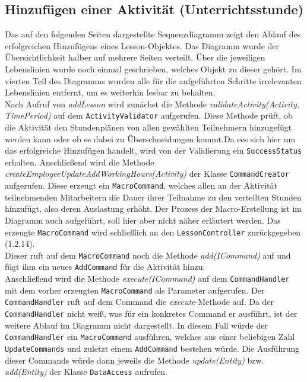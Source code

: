 \documentclass[fontsize=12pt,paper=a4,twoside]{scrartcl}
\begin{document}
\subsection{Hinzufügen einer Aktivität (Unterrichtsstunde)}
Das auf den folgenden Seiten dargestellte Sequenzdiagramm zeigt den Ablauf des erfolgreichen Hinzufügens eines Lesson-Objektes. Das Diagramm wurde der Übersichtlichkeit halber auf mehrere Seiten verteilt. Über die jeweiligen Lebenslinien wurde noch einmal geschrieben, welches Objekt zu dieser gehört. Im vierten Teil des Diagramms wurden alle für die aufgeführten Schritte irrelevanten Lebenslinien entfernt, um es weiterhin lesbar zu behalten.\\
Nach Aufruf von \textit{addLesson} wird zunächst die Methode \textit{validateActivity(Activity, TimePeriod)} auf dem \texttt{ActivityValidator} aufgerufen. Diese Methode prüft, ob die Aktivität den Stundenplänen von allen gewählten Teilnehmern hinzugefügt werden kann oder ob es dabei zu Überschneidungen kommt.Da ees sich hier um das erfolgreiche Hinzufügen handelt, wird von der Validierung ein \texttt{SuccessStatus} erhalten. Anschließend wird die Methode \textit{createEmployeeUpdateAddWorkingHours(Activity)} der Klasse \texttt{CommandCreator} aufgerufen. Diese erzeugt ein \texttt{MacroCommand}, welches allen an der Aktivität teilnehmenden Mitarbeitern die Dauer ihrer Teilnahme zu den verteilten Stunden hinzufügt, also deren Auslastung erhöht. Der Prozess der Macro-Erstellung ist im Diagramm auch aufgeführt, soll hier aber nicht näher erläutert werden. Das erzeugte \texttt{MacroCommand} wird schließlich an den \texttt{LessonController} zurückgegeben (1.2.14).\\
Dieser ruft auf dem \texttt{MacroCommand} noch die Methode \textit{add(ICommand)} auf und fügt ihm ein neues \texttt{AddCommand} für die Aktivität hinzu. \\
Anschließend wird die Methode \textit{execute(ICommand)} auf dem \texttt{CommandHandler} mit dem vorher erzeugten \texttt{MacroCommand} als Parameter aufgerufen. Der \texttt{CommandHandler} ruft auf dem Command die \textit{execute}-Methode auf. Da der \texttt{CommandHandler} nicht weiß, was für ein konkretes Command er ausführt, ist der weitere Ablauf im Diagramm nicht dargestellt. In diesem Fall würde der \texttt{CommandHandler} ein \texttt{MacroCommand} ausführen, welches aus einer beliebigen Zahl \texttt{UpdateCommands} und zuletzt einem \texttt{AddCommand} bestehen würde. Die Ausführung dieser Commands würde dann jeweils die Methode \textit{update(Entity)} bzw. \textit{add(Entity)} der Klasse \texttt{DataAccess} aufrufen.\\
\end{document}
